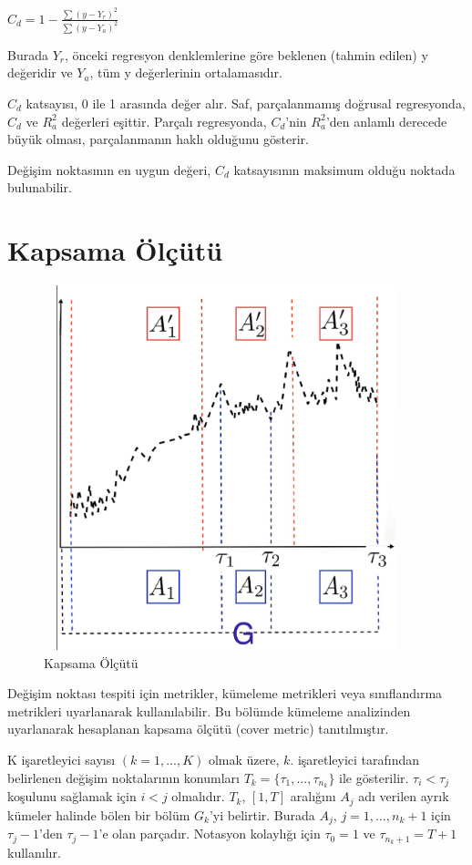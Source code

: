 \documentclass[12pt,twoside]{deuthesis}
\begin{document}
\(C_{d} = 1 - \frac{\sum (y-Y_{r})^{2}}{\sum (y-Y_{a})^{2}}\)

Burada \(Y_{r}\), önceki regresyon denklemlerine göre beklenen (tahmin edilen) y değeridir ve \(Y_{a}\), tüm y değerlerinin ortalamasıdır.

\(C_{d}\) katsayısı, 0 ile 1 arasında değer alır. Saf, parçalanmamış doğrusal regresyonda, \(C_{d}\) ve \(R_{a}^2\) değerleri eşittir. Parçalı regresyonda, \(C_{d}\)'nin \(R_{a}^2\)'den anlamlı derecede büyük olması, parçalanmanın haklı olduğunu gösterir.

Değişim noktasının en uygun değeri, \(C_{d}\) katsayısının maksimum olduğu noktada bulunabilir.

\section{Kapsama Ölçütü}\label{kapsama-uxf6luxe7uxfctuxfc}

\begin{figure}
\includegraphics[width=400px,height=400px]{figure/cover} \caption{Kapsama Ölçütü}\label{fig:unnamed-chunk-1}
\end{figure}

Değişim noktası tespiti için metrikler, kümeleme metrikleri veya sınıflandırma metrikleri uyarlanarak kullanılabilir. Bu bölümde kümeleme analizinden uyarlanarak hesaplanan kapsama ölçütü (cover metric) tanıtılmıştır.

K işaretleyici sayısı \((k=1,...,K)\) olmak üzere, \(k.\) işaretleyici tarafından belirlenen değişim noktalarının konumları \(T_k = \{\tau_1,...,\tau_{n_k}\}\) ile gösterilir. \(\tau_i < \tau_j\) koşulunu sağlamak için \(i < j\) olmalıdır. \(T_k\), \([1, T]\) aralığını \(A_j\) adı verilen ayrık kümeler halinde bölen bir bölüm \(G_k\)'yi belirtir. Burada \(A_j\), \(j = 1,...,n_k +1\) için \(\tau_{j} -1\)'den \(\tau_{j} -1\)'e olan parçadır. Notasyon kolaylığı için \(\tau_0 = 1\) ve \(\tau_{n_k+1} = T +1\) kullanılır.
\end{document}
